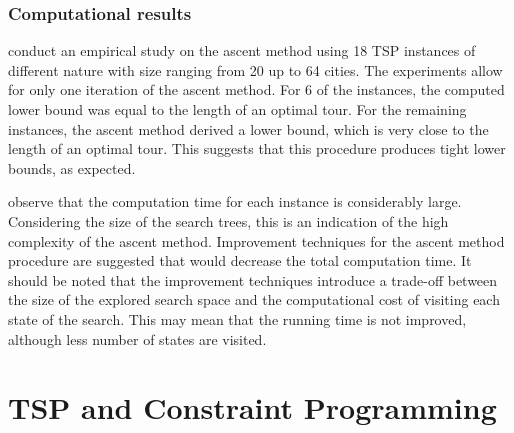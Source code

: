 \documentclass[a4paper,12pt]{article}
\begin{document}

\subsubsection*{Computational results}


\citet{HeldK71} conduct an empirical study on the ascent method using 18 TSP instances of different nature with size ranging from 20 up to 64 cities. The experiments allow for only one iteration of the ascent method. For 6 of the instances, the computed lower bound was equal to the length of an optimal tour. For the remaining instances, the ascent method derived a lower bound, which is very close to the length of an optimal tour. This suggests that this procedure produces tight lower bounds, as expected.


\citet{HeldK71} observe that the computation time for each instance is considerably large. Considering the size of the search trees, this is an indication of the high complexity of the ascent method. Improvement techniques for the ascent method procedure are suggested that would decrease the total computation time. It should be noted that the improvement techniques introduce a trade-off between the size of the explored search space and the computational cost of visiting each state of the search. This may mean that the running time is not improved, although less number of states are visited.

\section{TSP and Constraint Programming}
\label{sec:tspwithcp}
\end{document}

